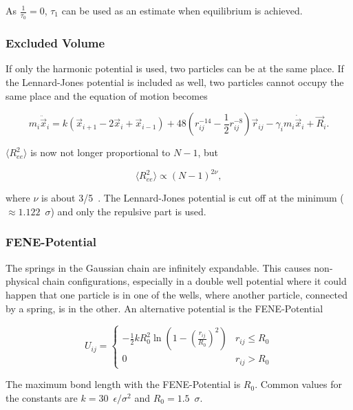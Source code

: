 \documentclass[a4paper]{article}
\begin{document}
As $\frac{1}{\tau_0} = 0$, $\tau_1$ can be used as an estimate when equilibrium is achieved.

\subsubsection{Excluded Volume}

If only the harmonic potential is used, two particles can be at the same place. If the Lennard-Jones potential is included as well, two particles cannot occupy the same place and the equation of motion becomes

\begin{equation}
m_i \ddot{\vec{x}}_i = k (\vec{x}_{i+1} - 2 \vec{x}_i + \vec{x}_{i-1}) + 48 \left( r_{ij}^{-14} - \frac{1}{2} r_{ij}^{-8} \right) \vec{r}_{ij} - \gamma_i m_i \dot{\vec{x}}_i + \vec{R}_i.
\end{equation}

$\langle R_{ee}^2 \rangle$ is now not longer proportional to $N-1$, but 

\begin{equation}
\langle R_{ee}^2 \rangle \propto (N-1)^{2 \nu},
\end{equation}

where $\nu$ is about 3/5~\cite{M.Doi1988}. The Lennard-Jones potential is cut off at the minimum ($\approx 1.122 \enspace \sigma$) and only the repulsive part is used.

\subsubsection{FENE-Potential}

The springs in the Gaussian chain are infinitely expandable. This causes non-physical chain configurations, especially in a double well potential where it could happen that one particle is in one of the wells, where another particle, connected by a spring, is in the other. An alternative potential is the FENE-Potential~\cite{GaryS.Grest1986}

\begin{equation}
U_{ij} =  
\begin{cases}
-\frac{1}{2} k R^2_0 \ln \left( 1 - \left( \frac{r_{ij}}{R_0} \right)^2 \right) & r_{ij} \leq R_0 \\
0 & r_{ij} > R_0
\end{cases}
\end{equation}

The maximum bond length with the FENE-Potential is $R_0$. Common values for the constants are $k = 30 \enspace \epsilon/\sigma^2$ and $R_0 = 1.5 \enspace \sigma$.
\end{document}
